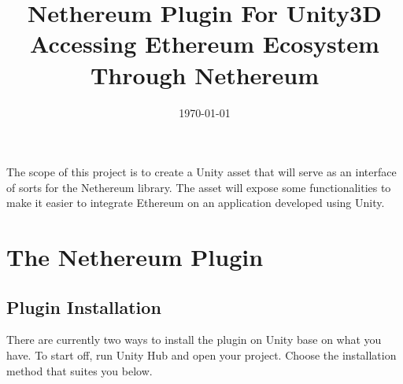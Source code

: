 \documentclass[a4paper, 11pt, titlepage]{article}
\date{\today}
\title{Nethereum Plugin For Unity3D\\\medskip
\large Accessing Ethereum Ecosystem Through Nethereum}
\begin{document}
\maketitle
The scope of this project is to create a Unity asset that will serve as an interface of sorts for the Nethereum library. The asset will expose some functionalities to make it easier to integrate Ethereum on an application developed using Unity.

\section{The Nethereum Plugin}
\label{sec:orgb276150}
\subsection{Plugin Installation}
\label{sec:org9e4a522}

There are currently two ways to install the plugin on Unity base on what you have. To start off, run Unity Hub and open your project. Choose the installation method that suites you below.
\end{document}
